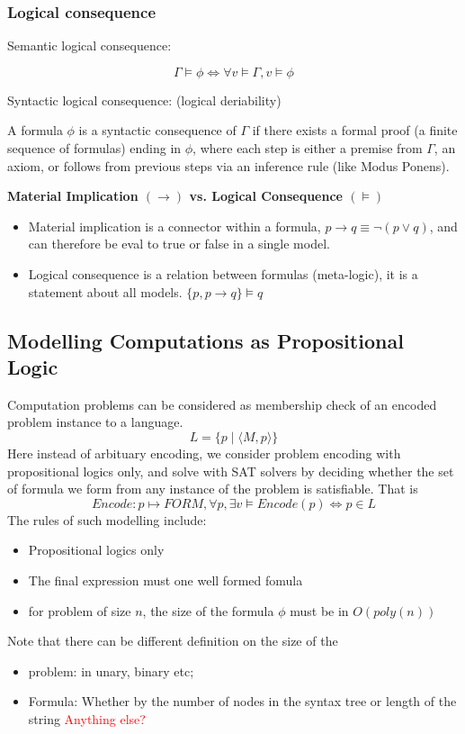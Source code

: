 \documentclass{article}
\newtheorem{definition}[theorem]{Definition}
\let\olddefinition\definition
\let\endolddefinition\enddefinition
\renewenvironment{definition}
  {\begin{tcolorbox}[
      colback=red!10,
      colframe=red!50!black,
      boxrule=0.6pt,
      arc=2pt,
      left=6pt,right=6pt,top=4pt,bottom=4pt,
      breakable
    ]\olddefinition}
  {\endolddefinition\end{tcolorbox}}
\begin{document}
\subsubsection{Logical consequence}
Semantic logical consequence:
\begin{definition}
    \[\Gamma \models \phi \iff \forall v \models \Gamma, v \models \phi\]
\end{definition}
\noindent Syntactic logical consequence: (logical deriability)
\begin{definition}
    A formula $\phi$ is a syntactic consequence of $\Gamma$ 
    if there exists a formal proof (a finite sequence of formulas) ending in $\phi$, where each step is either a premise from $\Gamma$, an axiom, or follows from previous steps via an inference rule (like Modus Ponens).
\end{definition}
\noindent \textbf{Material Implication $(\rightarrow)$ vs. Logical Consequence $(\models)$}
\begin{itemize}
    \item Material implication is a connector within a formula, $p \rightarrow q \equiv \neg(p \lor q)$, and can therefore be eval to true or false in a single model.
    \item Logical consequence is a relation between formulas (meta-logic), it is a statement about all models. $\{p, p\rightarrow q\}\models q$
\end{itemize}
\subsection{Modelling Computations as Propositional Logic}
Computation problems can be considered as membership check of an encoded problem instance to a language. 
\[L = \{p \mid \langle M, p\rangle\}\]
Here instead of arbituary encoding, we consider problem encoding with propositional logics only, 
and solve with SAT solvers by deciding whether the set of formula we form from any instance of the problem is satisfiable.
That is 
\[Encode: p \mapsto FORM, \forall p, \exists v \models Encode(p) \iff p \in L\]
The rules of such modelling include:
\begin{itemize}
    \item Propositional logics only
    \item The final expression must one well formed fomula
    \item for problem of size $n$, the size of the formula $\phi$ must be in $O(poly(n))$
\end{itemize}
Note that there can be different definition on the size of the 
\begin{itemize}
    \item problem: in unary, binary etc; 
    \item Formula: Whether by the number of nodes in the syntax tree or length of the string \textcolor{red}{Anything else?}
\end{itemize}
\end{document}
